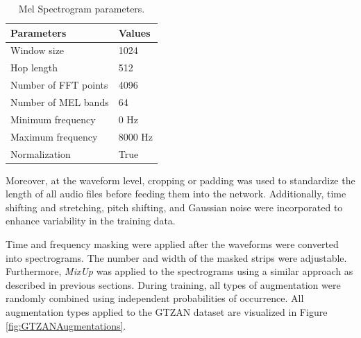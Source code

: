 \begin{table}[h!]
\centering
\caption{Mel Spectrogram parameters.}
\begin{tabular}{|>{}l|l|}
\hline
\textbf{Parameters}    & \textbf{Values}  \\ \hline
Window size            & 1024    \\ \hline
Hop length             & 512     \\ \hline
Number of FFT points   & 4096    \\ \hline
Number of MEL bands    & 64      \\ \hline
Minimum frequency      & 0 Hz    \\ \hline
Maximum frequency      & 8000 Hz \\ \hline
Normalization          & True    \\ \hline
\end{tabular}
\label{tab:parameters}
\end{table}

Moreover, at the waveform level, cropping or padding was used to standardize the length of all audio files before feeding them into the network. Additionally, time shifting and stretching, pitch shifting, and Gaussian noise were incorporated to enhance variability in the training data.

Time and frequency masking were applied after the waveforms were converted into spectrograms. The number and width of the masked strips were adjustable. Furthermore, \textit{MixUp} was applied to the spectrograms using a similar approach as described in previous sections. During training, all types of augmentation were randomly combined using independent probabilities of occurrence. All augmentation types applied to the GTZAN dataset are visualized in Figure \ref{fig:GTZANAugmentations}.


